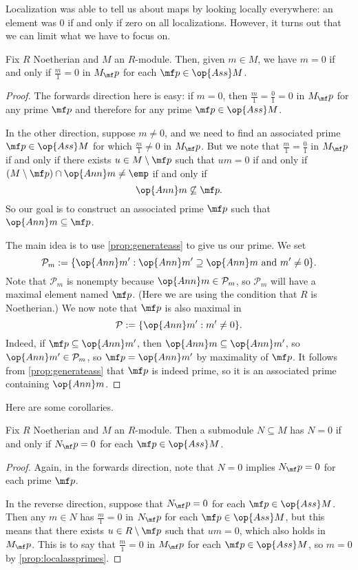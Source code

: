 Localization was able to tell us about maps by looking locally everywhere: an element was $0$ if and only if zero on all localizations. However, it turns out that we can limit what we have to focus on.
\begin{proposition} \label{prop:localassprimes}
	Fix $R$ Noetherian and $M$ an $R$-module. Then, given $m\in M$, we have $m=0$ if and only if $\frac m1=0$ in $M_\mf p$ for each $\mf p\in\op{Ass}M$.
\end{proposition}	
\begin{proof}
	The forwards direction here is easy: if $m=0$, then $\frac m1=\frac01=0$ in $M_\mf p$ for any prime $\mf p$ and therefore for any prime $\mf p\in\op{Ass}M$.

	In the other direction, suppose $m\ne0$, and we need to find an associated prime $\mf p\in\op{Ass}M$ for which $\frac m1\ne0$ in $M_\mf p$. But we note that $\frac m1=\frac01$ in $M_\mf p$ if and only if there exists $u\in M\setminus\mf p$ such that $um=0$ if and only if $(M\setminus\mf p)\cap\op{Ann}m\ne\emp$ if and only if
	\[\op{Ann}m\not\subseteq\mf p.\]
	So our goal is to construct an associated prime $\mf p$ such that $\op{Ann}m\subseteq\mf p$.
	
	The main idea is to use \autoref{prop:generateass} to give us our prime. We set
	\[\mathcal P_m:=\{\op{Ann}m':\op{Ann}m'\supseteq\op{Ann}m\text{ and }m'\ne0\}.\]
	Note that $\mathcal P_m$ is nonempty because $\op{Ann}m\in\mathcal P_m$, so $\mathcal P_m$ will have a maximal element named $\mf p$. (Here we are using the condition that $R$ is Noetherian.) We now note that $\mf p$ is also maximal in
	\[\mathcal P:=\{\op{Ann}m':m'\ne0\}.\]
	Indeed, if $\mf p\subseteq\op{Ann}m'$, then $\op{Ann}m\subseteq\op{Ann}m'$, so $\op{Ann}m'\in\mathcal P_m$, so $\mf p=\op{Ann}m'$ by maximality of $\mf p$. It follows from \autoref{prop:generateass} that $\mf p$ is indeed prime, so it is an associated prime containing $\op{Ann}m$.
\end{proof}
Here are some corollaries.
\begin{corollary} \label{cor:localasssubmod}
	Fix $R$ Noetherian and $M$ an $R$-module. Then a submodule $N\subseteq M$ has $N=0$ if and only if $N_\mf p=0$ for each $\mf p\in\op{Ass}M$.
\end{corollary}
\begin{proof}
	Again, in the forwards direction, note that $N=0$ implies $N_\mf p=0$ for each prime $\mf p$.

	In the reverse direction, suppose that $N_\mf p=0$ for each $\mf p\in\op{Ass}M$. Then any $m\in N$ has $\frac m1=0$ in $N_\mf p$ for each $\mf p\in\op{Ass}M$, but this means that there exists $u\in R\setminus\mf p$ such that $um=0$, which also holds in $M_\mf p$. This is to say that $\frac m1=0$ in $M_\mf p$ for each $\mf p\in\op{Ass}M$, so $m=0$ by \autoref{prop:localassprimes}.
\end{proof}
